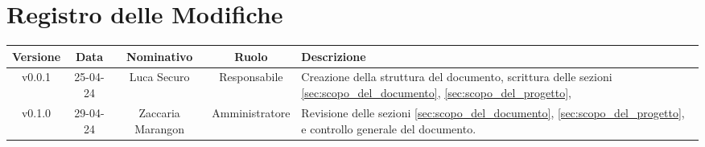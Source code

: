 \section*{\Large Registro delle Modifiche}
    \begin{table}[h]
        \centering
        \renewcommand\tabularxcolumn[1]{m{#1}} %
        \renewcommand{\arraystretch}{1.5}
        \begin{tabularx}{0.98\textwidth}
            {c|c|c|c|>{\centering\arraybackslash}X}
            \rowcolor{black}
            \textbf{\color{white} Versione} & \textbf{\color{white} Data} & \textbf{\color{white} Nominativo} & \textbf{\color{white} Ruolo} & \textbf{\color{white} Descrizione} \\ 
            \hline

            
            
            v0.0.1 & 25-04-24 & Luca Securo & Responsabile & Creazione della struttura del documento, scrittura delle sezioni \ref{sec:scopo_del_documento}, 
                                                             \ref{sec:scopo_del_progetto},\\
            v0.1.0 & 29-04-24 & Zaccaria Marangon & Amministratore & Revisione delle sezioni \ref{sec:scopo_del_documento}, \ref{sec:scopo_del_progetto}, 
                                                                     e controllo generale del documento.\\
            
            
               
            
            \hline
        \end{tabularx}
    \end{table}